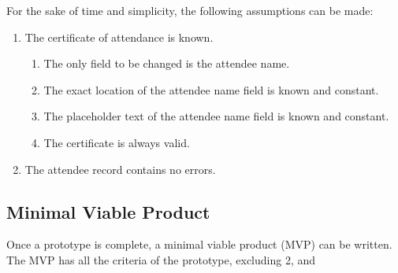 \documentclass[11pt]{article}
\begin{document}
\noindent
For the sake of time and simplicity, the following assumptions can be made:

\begin{enumerate}
    \item The certificate of attendance is known.
    \begin{enumerate}
        \item The only field to be changed is the attendee name.
        \item The exact location of the attendee name field is known and constant.
        \item The placeholder text of the attendee name field is known and constant.
        \item The certificate is always valid.
    \end{enumerate}
    \item The attendee record contains no errors.
\end{enumerate}

\subsection{Minimal Viable Product}

Once a prototype is complete, a minimal viable product (MVP) can be written. The MVP has all the criteria of the prototype, excluding 2, and
\end{document}
